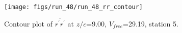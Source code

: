 \begin{figure}[H]
\centering
\texttt{[image: figs/run\_48/run\_48\_rr\_contour]}
\caption{Contour plot of $\overline{r^\prime r^\prime}$ at $z/c$=9.00, $V_{free}$=29.19, station 5.}
\label{fig:run_48_rr_contour}
\end{figure}


